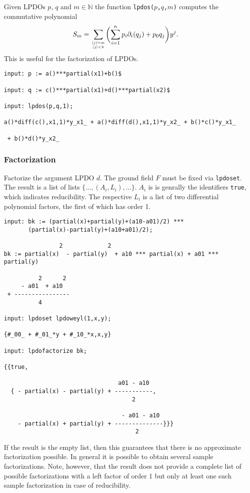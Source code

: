 Given LPDOs $p$, $q$ and $m\in\mathbb{N}$ the function
\texttt{lpdos($p$,$q$,$m$)} computes the commutative polynomial $$S_m
= \sum_{|j| = m\atop |j| < k} \biggl(\sum_{i = 1}^n
p_i \partial_i(q_j) + p_0 q_j\biggr)y^{j}.$$ This is useful for the
factorization of LPDOs. %
\begin{footnotesize}
\begin{verbatim}
input: p := a()***partial(x1)+b()$

input: q := c()***partial(x1)+d()***partial(x2)$

input: lpdos(p,q,1);

a()*diff(c(),x1,1)*y_x1_ + a()*diff(d(),x1,1)*y_x2_ + b()*c()*y_x1_

 + b()*d()*y_x2_
\end{verbatim}
\end{footnotesize}


\subsubsection{Factorization}

Factorize the argument LPDO $d$. The ground field $F$ must be fixed via
\texttt{lpdoset}. The result is a list of lists
$\{\dots,(A_i,L_i),\dots\}$. $A_i$ is is genrally the identifiers
\texttt{true}, which indicates reducibility. The respective $L_i$ is a
list of two differential polynomial factors, the first of which has
order 1.

\begin{footnotesize}
\begin{verbatim}
input: bk := (partial(x)+partial(y)+(a10-a01)/2) ***
       (partial(x)-partial(y)+(a10+a01)/2);

                2             2
bk := partial(x)  - partial(y)  + a10 *** partial(x) + a01 *** partial(y)

          2      2
     - a01  + a10
 + ----------------
          4

input: lpdoset lpdoweyl(1,x,y);

{#_00_ + #_01_*y + #_10_*x,x,y}

input: lpdofactorize bk;

{{true,

                                 a01 - a10
  { - partial(x) - partial(y) + -----------,
                                     2

                                  - a01 - a10
    - partial(x) + partial(y) + --------------}}}
                                      2
\end{verbatim}
\end{footnotesize}
If the result is the empty list, then this guarantees that there is no
approximate factorization possible. In general it is possible to obtain
several sample factorizations. Note, however, that the result does not
provide a complete list of possible factorizations with a left factor of
order 1 but only at least one such sample factorization in case of
reducibility.

